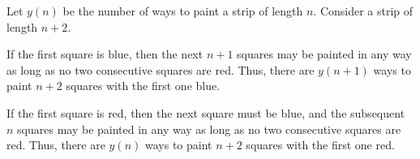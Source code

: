 \documentclass[newpage]{homework}
\begin{document}
	\maketitle
	
	
	
	Let $y(n)$ be the number of ways to paint a strip of length $n$. Consider a strip of length $n+2$. 
	
	If the first square is blue, then the next $n+1$ squares may be painted in any way as long as no two consecutive squares are red. Thus, there are $y(n+1)$ ways to paint $n+2$ squares with the first one blue. 
	
	If the first square is red, then the next square must be blue, and the subsequent $n$ squares may be painted in any way as long as no two consecutive squares are red. Thus, there are $y(n)$ ways to paint $n+2$ squares with the first one red.
	
\end{document}
